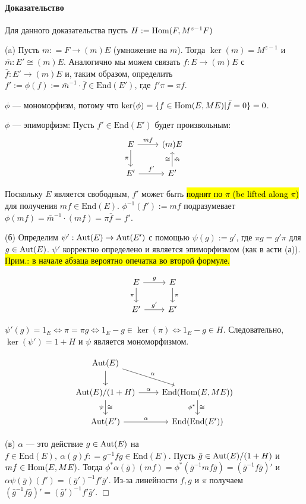 \documentclass[a4paper,12pt]{article}
\newcommand{\Endom}{\text{End}}
\begin{document}
 
\paragraph{Доказательство}
Для данного доказательства пусть $H:= \text{Hom}(F, M^{z-1} F)$

(a) Пусть $m : = F \rightarrow (m)E$ (умножение на $m$). Тогда $\ker (m) = M^{z-1}$ и $\bar{m} : E' \cong (m)E$. Аналогично мы можем связать $f : E\rightarrow(m)E$ с $\bar{f} : E' \rightarrow (m)E$ и, таким образом, определить $f' := \phi(f) := \bar{m}^{-1} \cdot \bar{f} \in \Endom(E')$, где $f'\pi = \pi f$.

$\phi$ --- мономорфизм, потому что $\ker(\phi) = \{f \in \text{Hom}(E, ME) | \bar{f} = 0\} = 0$.

$\phi$ --- эпиморфизм: Пусть $f' \in \Endom(E')$ будет произвольным:
$$
\begin{tikzcd}
	E	\ar{d}[']{\pi} \arrow{r}{mf}	& (m)E \\
	E' 	\rar{f'}							& E' \ar{u}{\cong}[']{\bar{m}}
\end{tikzcd}
$$

Поскольку $E$ является свободным, $f'$ может быть \hl{поднят по $\pi$ (be lifted along $\pi$)} для получения $mf \in \Endom(E)$. $\phi^{-1}(f') := mf$ подразумевает $\phi(mf) = \bar{m}^{-1} \cdot (mf) = \pi \bar{f} = f'$.

(б) Определим $\psi' : \text{Aut}(E) \rightarrow \text{Aut}(E')$ с помощью $\psi (g) := g'$, где $\pi g = g' \pi$ для $g \in \text{Aut}(E)$. $\psi'$ корректно определено и является эпиморфизмом (как в асти (а)). \hl{Прим.: в начале абзаца вероятно опечатка во второй формуле.} 

$$
\begin{tikzcd}
	E	\ar{d}[']{\pi} \arrow{r}{g}	& E \ar{d}{\pi} \\
	E' 	\rar{g'}			& E'
\end{tikzcd}
$$

$\psi' (g) = 1_E  \Leftrightarrow \pi = \pi g \Leftrightarrow 1_E - g \in \ker(\pi) \Leftrightarrow 1_E - g \in H$. Следовательно, $\ker(\psi') = 1 + H$ и $\psi$ является мономорфизмом.


$$
\begin{tikzcd}
	\Aut(E) \ar{d} \ar{rd}{\alpha} & \\
	\Aut(E) / (1+H) \rar{\alpha} \dar{\cong}[']{\psi}& \Endom(\Hom(E,ME)) \dar{\cong}[']{\phi^*} \\
	\Aut(E') \rar{\alpha}&  \Endom(\Endom(E'))
\end{tikzcd}
$$

(в) $\alpha$ --- это действие $g \in \text{Aut}(E)$ на $f \in \Endom(E), ~ \alpha (g) f : = g^{-1} f g \in \Endom(E)$. Пусть $\bar{g} \in \text{Aut}(E)/(1+H)$ и $mf \in \text{Hom}(E, ME)$. Тогда $\phi^* \alpha (\bar{g})(mf) = \phi^*(\bar{g}^{-1}mf\bar{g}) = (\bar{g}^{-1} f \bar{g})'$ и $\alpha \psi (\bar{g})(f') = (\bar{g}')^{-1} f' \bar{g}'$. Из-за линейности $f, g$ и $\pi$ получаем $(\bar{g}^{-1} f \bar{g})' = (\bar{g}')^{-1}f'\bar{g}'$. $\Box$
\end{document}
